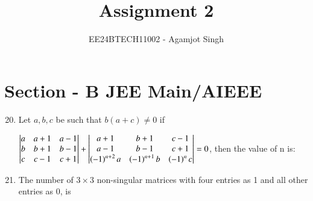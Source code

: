 \documentclass[journal,12pt,twocolumn]{IEEEtran}
\theoremstyle{remark}
\begin{document}

\vspace{3cm}

\title{Assignment 2}
\author{EE24BTECH11002 - Agamjot Singh}
\maketitle
\newpage
\bigskip

\renewcommand{\thefigure}{\theenumi}
\renewcommand{\thetable}{\theenumi}
\section*{Section - B JEE Main/AIEEE}
\begin{enumerate}
    \setcounter{enumi}{19}

    \item Let $a,b,c$ be such that $b(a+c)\neq0$ if

    		$\begin{vmatrix}
			a & a+1 & a-1\\
			b & b+1 & b-1\\
			c & c-1 & c+1\\
		\end{vmatrix}
		+
    		\begin{vmatrix}
			a+1 & b+1 & c-1\\
			a-1 & b-1 & c+1\\
			\left(-1\right)^{n+2}a & \left(-1\right)^{n+1}b & \left(-1\right)^{n}c\\
		\end{vmatrix}
		= 0$,
		then the value of n is:
	\hfill{}
	\begin{enumerate}[label={(\alph*)}]

	\end{enumerate}

    \item The number of $3\times3$ non-singular matrices with four entries as 1 and all other entries as 0, is 
	\hfill{}{\par}



\end{enumerate}
\end{document}
